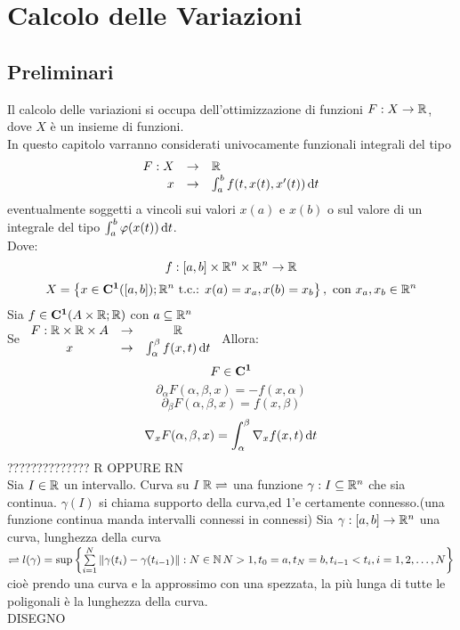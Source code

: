 \chapter{Calcolo delle Variazioni}
\newpage
\section{Preliminari}
Il calcolo delle variazioni si occupa dell'ottimizzazione di funzioni $ F : X \to \mathbb{R} $, dove $X$ è un insieme di funzioni.\\
In questo capitolo varranno considerati univocamente funzionali integrali del tipo
\[\begin{array}{rcl} F: X & \to & \mathbb{R} \\
x & \to & \int_{a}^b f(t,x(t), x'(t))\,\mathrm{d}{t}\end{array}\]
eventualmente soggetti a vincoli sui valori $x(a)$ e $x(b)$ o sul valore di un integrale del tipo $\int_a^b \varphi(x(t))\,\mathrm{d}{t}$.\\
Dove:
\[f: \left[a,b\right]\times \mathbb{R} ^n\times \mathbb{R} ^n \to \mathbb{R}\]
\[X=\left\{x\in \mathbf{C^{1}}(\left[a,b\right]); \mathbb{R} ^n\text{ t.c.: }x(a)=x_a, x(b)=x_b \right\},\text{ con }x_a,x_b\in \mathbb{R} ^n\]
\proposition
Sia $f\in \mathbf{C^{1}}(A\times \mathbb{R} ; \mathbb{R} )$ con $a\subseteq \mathbb{R} ^n$\\
Se $\begin{array}{ccc} F: \mathbb{R} \times \mathbb{R} \times A & \to & \mathbb{R} \\
x & \to & \int_{\alpha}^\beta f(x,t)\,\mathrm{d}{t}\end{array}$
Allora:
\[ F\in \mathbf{C^{1}}\]
\[ \partial_\alpha F(\alpha,\beta,x)=-f(x,\alpha)\]
\[ \partial_\beta F(\alpha,\beta,x)=f(x,\beta)\]
\[ \nabla_x F(\alpha,\beta,x)=\int_{\alpha}^{\beta}\nabla_xf(x,t)\,\mathrm{d}{t}\]
 ?????????????? R OPPURE RN\\
Sia $I\in \mathbb{R} $ un intervallo. Curva su $I$ $ \mathbb{R} \rightleftharpoons$ una funzione $\gamma:I\subseteq \mathbb{R} ^n$ che sia continua.
\observation
$\gamma(I)$ si chiama supporto della curva,ed 1'e certamente connesso.(una funzione continua manda intervalli connessi in connessi)
Sia $\gamma : \left[a,b\right] \to \mathbb{R}^n$ una curva, lunghezza della curva $\rightleftharpoons l(\gamma)=\sup\left\{\sum\limits_{i=1}^{N}\left\|\gamma(t_i)-\gamma(t_{i-1})\right\|: N\in\mathbb{N}\,N>1,t_0=a,t_N=b,t_{i-1}<t_i, i=1,2,\ldots,N \right\}$ 
cioè prendo una curva e la approssimo con una spezzata, la più lunga di tutte le poligonali è la lunghezza della curva.\\
DISEGNO\\
